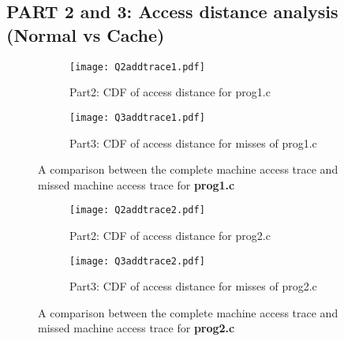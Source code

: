 \subsection*{PART 2 and 3: Access distance analysis (Normal vs Cache)}


\begin{figure}[H]
\centering
\begin{subfigure}{.48\textwidth}
  \centering
  \texttt{[image: Q2addtrace1.pdf]}
  \caption{Part2: CDF of access distance for prog1.c}
  \label{fig:sub1}
\end{subfigure}%
\hspace{2mm}
\begin{subfigure}{.465\textwidth}
  \centering
  \texttt{[image: Q3addtrace1.pdf]}
  \caption{Part3: CDF of access distance for misses of prog1.c}
  \label{fig:sub2}
\end{subfigure}
\caption{A comparison between the complete machine access trace and missed machine access trace for \textbf{prog1.c}}
\label{fig:test1}
\vspace{0.8in}
\begin{subfigure}{.48\textwidth}
  \centering
  \texttt{[image: Q2addtrace2.pdf]}
  \caption{Part2: CDF of access distance for prog2.c}
  \label{fig:sub3}
\end{subfigure}%
\hspace{2mm}
\begin{subfigure}{.465\textwidth}
  \centering
  \texttt{[image: Q3addtrace2.pdf]}
  \caption{Part3: CDF of access distance for misses of prog2.c}
  \label{fig:sub4}
\end{subfigure}
\caption{A comparison between the complete machine access trace and missed machine access trace for \textbf{prog2.c}}
\label{fig:test2}
\end{figure}


